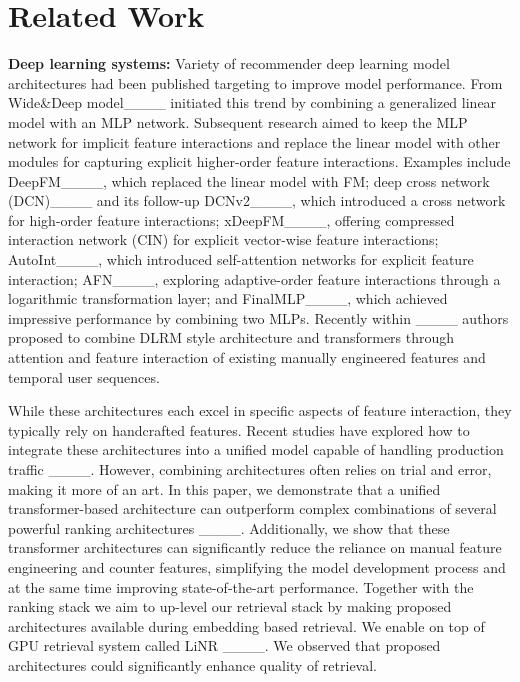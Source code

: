 \section{Related Work}
\label{sec:related_work}

\textbf{Deep learning systems:} Variety of recommender deep learning model architectures had been published targeting to improve model performance.  From Wide\&Deep model____ initiated this trend by combining a generalized linear model with an MLP network. Subsequent research aimed to keep the MLP network for implicit feature interactions and replace the linear model with other modules for capturing explicit higher-order feature interactions. Examples include DeepFM____, which replaced the linear model with FM; deep cross network (DCN)____ and its follow-up DCNv2____, which introduced a cross network for high-order feature interactions; xDeepFM____, offering compressed interaction network (CIN) for explicit vector-wise feature interactions; AutoInt____, which introduced self-attention networks for explicit feature interaction; AFN____, exploring adaptive-order feature interactions through a logarithmic transformation layer; and FinalMLP____, which achieved impressive performance by combining two MLPs. Recently within ____ authors proposed to combine DLRM style architecture and transformers through attention and feature interaction of existing manually engineered features and temporal user sequences.

While these architectures each excel in specific aspects of feature interaction, they typically rely on handcrafted features. Recent studies have explored how to integrate these architectures into a unified model capable of handling production traffic ____. However, combining architectures often relies on trial and error, making it more of an art.
In this paper, we demonstrate that a unified transformer-based architecture can outperform complex combinations of several powerful ranking architectures ____. Additionally, we show that these transformer architectures can significantly reduce the reliance on manual feature engineering and counter features, simplifying the model development process and at the same time improving state-of-the-art performance. Together with the ranking stack we aim to up-level our retrieval stack by making proposed architectures available during embedding based retrieval. We enable {\systemname} on top of GPU retrieval system called LiNR ____. We observed that proposed architectures could significantly enhance quality of retrieval.

